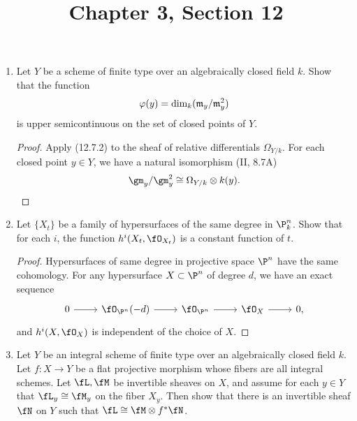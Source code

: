 \documentclass[a4paper]{article}
\title{Chapter 3, Section 12}
\begin{document}
\maketitle

\begin{enumerate} [label=\textbf{\arabic*.}, leftmargin=0em]

  \item Let $Y$ be a scheme of finite type over an algebraically closed field $k$. Show that the function
        \begin{equation*}
          \varphi(y) = \dim_k(\mathfrak{m}_y/\mathfrak{m}_y^2)
        \end{equation*}
        is upper semicontinuous on the set of closed points of $Y$.

        \begin{proof}
          Apply (12.7.2) to the sheaf of relative differentials $\Omega_{Y/k}$.
          For each closed point $y \in Y$, we have a natural isomorphism (II, 8.7A)
          \begin{equation*}
            \gm_y/\gm_y^2 \cong \Omega_{Y / k} \otimes k(y).
          \end{equation*}
        \end{proof}

  \item Let $\{X_t\}$ be a family of hypersurfaces of the same degree in $\P_k^n$. Show that for each $i$, the function $h^i(X_t, \fO_{X_t})$ is a constant function of $t$.

        \begin{proof}
          Hypersurfaces of same degree in projective space $\P^n$ have the same cohomology.
          For any hypersurface $X \subset \P^n$ of degree $d$, we have an exact sequence
          \[ \begin{tikzcd}
              0 \arrow[r] & \fO_{\P^n}(-d) \arrow[r] & \fO_{\P^n} \arrow[r] & \fO_X \arrow[r] & 0,
            \end{tikzcd} \]
          and $\cdh^i(X, \fO_X)$ is independent of the choice of $X$.
        \end{proof}

  \item[\textbf{4.}] Let $Y$ be an integral scheme of finite type over an algebraically closed field $k$. Let $f : X \to Y$ be a flat projective morphism whose fibers are all integral schemes. Let $\fL, \fM$ be invertible sheaves on $X$, and assume for each $y \in Y$ that $\fL_y \cong \fM_y$ on the fiber $X_y$. Then show that there is an invertible sheaf $\fN$ on $Y$ such that $\fL \cong \fM \otimes f^* \fN$.


\end{enumerate}
\end{document}
